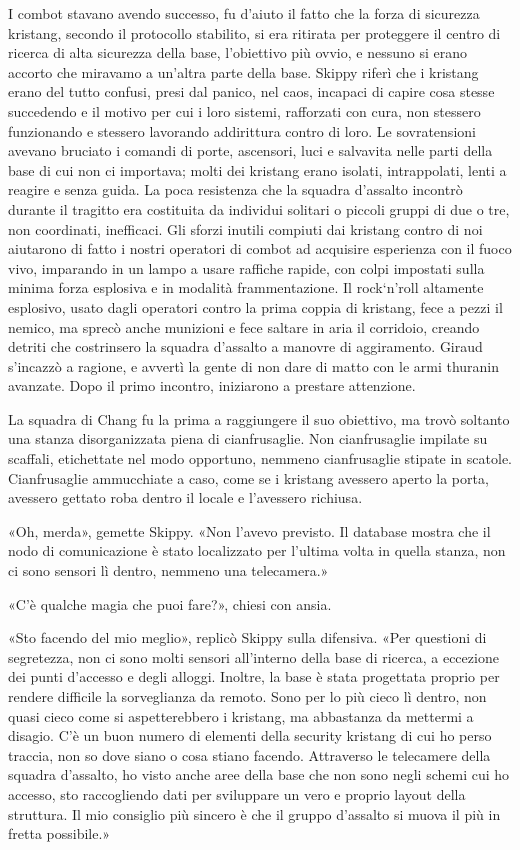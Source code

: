 I combot stavano avendo successo, fu d'aiuto il fatto che la forza di
sicurezza kristang, secondo il protocollo stabilito, si era ritirata per
proteggere il centro di ricerca di alta sicurezza della base,
l'obiettivo più ovvio, e nessuno si erano accorto che miravamo a
un'altra parte della base. Skippy riferì che i kristang erano del tutto
confusi, presi dal panico, nel caos, incapaci di capire cosa stesse
succedendo e il motivo per cui i loro sistemi, rafforzati con cura, non
stessero funzionando e stessero lavorando addirittura contro di loro. Le
sovratensioni avevano bruciato i comandi di porte, ascensori, luci e
salvavita nelle parti della base di cui non ci importava; molti dei
kristang erano isolati, intrappolati, lenti a reagire e senza guida. La
poca resistenza che la squadra d'assalto incontrò durante il tragitto
era costituita da individui solitari o piccoli gruppi di due o tre, non
coordinati, inefficaci. Gli sforzi inutili compiuti dai kristang contro
di noi aiutarono di fatto i nostri operatori di combot ad acquisire
esperienza con il fuoco vivo, imparando in un lampo a usare raffiche
rapide, con colpi impostati sulla minima forza esplosiva e in modalità
frammentazione. Il rock`n'roll altamente esplosivo, usato dagli
operatori contro la prima coppia di kristang, fece a pezzi il nemico, ma
sprecò anche munizioni e fece saltare in aria il corridoio, creando
detriti che costrinsero la squadra d'assalto a manovre di aggiramento.
Giraud s'incazzò a ragione, e avvertì la gente di non dare di matto con
le armi thuranin avanzate. Dopo il primo incontro, iniziarono a prestare
attenzione.

La squadra di Chang fu la prima a raggiungere il suo obiettivo, ma trovò
soltanto una stanza disorganizzata piena di cianfrusaglie. Non
cianfrusaglie impilate su scaffali, etichettate nel modo opportuno,
nemmeno cianfrusaglie stipate in scatole. Cianfrusaglie ammucchiate a
caso, come se i kristang avessero aperto la porta, avessero gettato roba
dentro il locale e l'avessero richiusa.

«Oh, merda», gemette Skippy. «Non l'avevo previsto. Il database mostra
che il nodo di comunicazione è stato localizzato per l'ultima volta in
quella stanza, non ci sono sensori lì dentro, nemmeno una telecamera.»

«C'è qualche magia che puoi fare?», chiesi con ansia.

«Sto facendo del mio meglio», replicò Skippy sulla difensiva. «Per
questioni di segretezza, non ci sono molti sensori all'interno della
base di ricerca, a eccezione dei punti d'accesso e degli alloggi.
Inoltre, la base è stata progettata proprio per rendere difficile la
sorveglianza da remoto. Sono per lo più cieco lì dentro, non quasi cieco
come si aspetterebbero i kristang, ma abbastanza da mettermi a disagio.
C'è un buon numero di elementi della security kristang di cui ho perso
traccia, non so dove siano o cosa stiano facendo. Attraverso le
telecamere della squadra d'assalto, ho visto anche aree della base che
non sono negli schemi cui ho accesso, sto raccogliendo dati per
sviluppare un vero e proprio layout della struttura. Il mio consiglio
più sincero è che il gruppo d'assalto si muova il più in fretta
possibile.»

